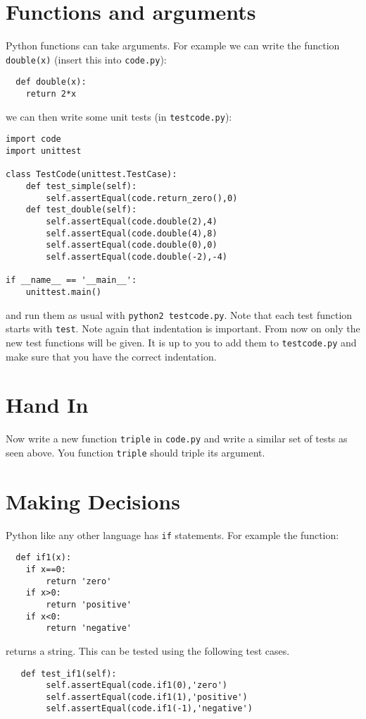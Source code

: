 \documentclass{paper}
\begin{document}
\section*{Functions and arguments}
Python functions can take arguments. For example we can write the
function {\tt double(x)} (insert this into {\tt code.py}):
\begin{lstlisting}
  def double(x):
    return 2*x
\end{lstlisting}
we can then write some unit tests (in {\tt testcode.py}):
\begin{lstlisting}
import code
import unittest

class TestCode(unittest.TestCase):
    def test_simple(self):
        self.assertEqual(code.return_zero(),0)
    def test_double(self):
        self.assertEqual(code.double(2),4)
        self.assertEqual(code.double(4),8)
        self.assertEqual(code.double(0),0)
        self.assertEqual(code.double(-2),-4)

if __name__ == '__main__':
    unittest.main()

\end{lstlisting} and run them as usual with {\tt python2 testcode.py}. Note that each test function starts
with {\tt test}. Note again that indentation is important. From now on only
the new test functions will be given. It is up to you to add them to
{\tt testcode.py} and make sure that you have the correct indentation.

\section{Hand In}
Now write a new function {\tt triple} in {\tt code.py} and write a
similar set of tests as seen above. You function {\tt triple} should triple
its argument.

\section*{Making Decisions}
Python like any other language has {\tt if} statements. For example
the function:
\begin{lstlisting}
  def if1(x):
    if x==0:
        return 'zero'
    if x>0:
        return 'positive'
    if x<0:
        return 'negative'
\end{lstlisting}
returns a string. This can be tested using the following test cases.
\begin{lstlisting}
   def test_if1(self):
        self.assertEqual(code.if1(0),'zero')
        self.assertEqual(code.if1(1),'positive')
        self.assertEqual(code.if1(-1),'negative')
\end{lstlisting}
\end{document}
